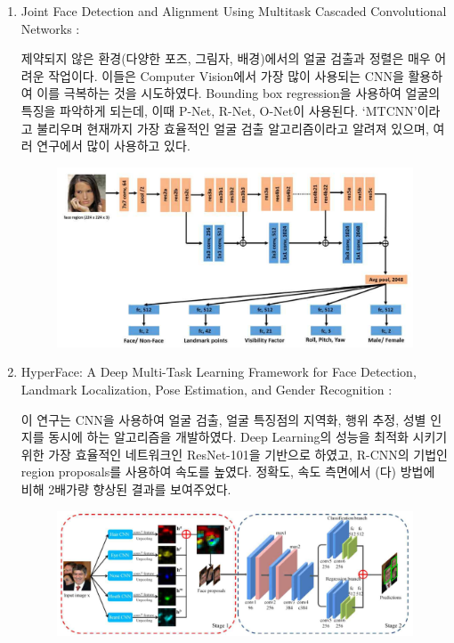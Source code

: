 \documentclass[chapter,oneside]{oblivoir}
\begin{document}
\begin{enumerate}
    \item Joint Face Detection and Alignment Using Multitask Cascaded Convolutional Networks : 

    제약되지 않은 환경(다양한 포즈, 그림자, 배경)에서의 얼굴 검출과 정렬은 매우 어려운 작업이다. 
    이들은 Computer Vision에서 가장 많이 사용되는 CNN을 활용하여 이를 극복하는 것을 시도하였다.
    Bounding box regression을 사용하여 얼굴의 특징을 파악하게 되는데, 이때 P-Net, R-Net, O-Net이 사용된다.
    ‘MTCNN’이라고 불리우며 현재까지 가장 효율적인 얼굴 검출 알고리즘이라고 알려져 있으며, 여러 연구에서 많이 사용하고 있다. 

    \begin{figure}[h!]
        \centering
        \includegraphics[scale = 0.7]{pic/chp1/img530}
    \end{figure}

    \item HyperFace: A Deep Multi-Task Learning Framework for Face Detection, Landmark Localization, Pose Estimation, and Gender Recognition : 

    이 연구는 CNN을 사용하여 얼굴 검출, 얼굴 특징점의 지역화, 행위 추정, 성별 인지를 동시에 하는 알고리즘을 개발하였다. 
    Deep Learning의 성능을 최적화 시키기 위한 가장 효율적인 네트워크인 ResNet-101을 기반으로 하였고, R-CNN의 기법인 region proposals를 사용하여 속도를 높였다. 
    정확도, 속도 측면에서 (다) 방법에 비해 2배가량 향상된 결과를 보여주었다. 

    \begin{figure}[h!]
        \centering
        \includegraphics[scale = 0.7]{pic/chp1/img552}
    \end{figure}


\end{enumerate}
\end{document}
